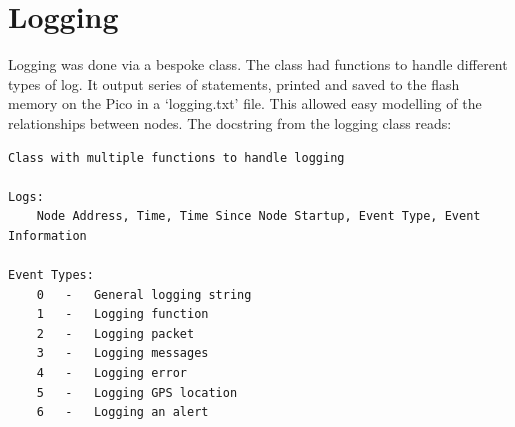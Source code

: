 \documentclass[12pt,a4paper]{report}
\begin{document}
\section{Logging}
Logging was done via a bespoke class. The class had functions to handle different types of log. It output series of statements, printed and saved to the flash memory on the Pico in a `logging.txt' file. This allowed easy modelling of the relationships between nodes. The docstring from the logging class reads:\begin{verbatim}
Class with multiple functions to handle logging
    
Logs: 
    Node Address, Time, Time Since Node Startup, Event Type, Event Information

Event Types:
    0   -   General logging string
    1   -   Logging function
    2   -   Logging packet
    3   -   Logging messages
    4   -   Logging error
    5   -   Logging GPS location
    6   -   Logging an alert
    
\end{verbatim}
\end{document}
